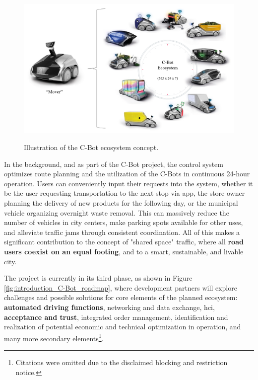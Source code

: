 \begin{figure}[htbp]
    \raggedright
        \caption{Illustration of the C-Bot ecosystem concept.}
        \includegraphics[width=1\textwidth]{resources/images/020-introduction/Introduction_context_C-Bot.png}
        \label{fig:introduction_C-Bot_ecosystem}
\end{figure} 

In the background, and as part of the C-Bot project, the control system optimizes route planning and the utilization of the C-Bots in continuous 24-hour operation. Users can conveniently input their requests into the system, whether it be the user requesting transportation to the next stop via app, the store owner planning the delivery of new products for the following day, or the municipal vehicle organizing overnight waste removal. This can massively reduce the number of vehicles in city centers, make parking spots available for other uses, and alleviate traffic jams through consistent coordination. All of this makes a significant contribution to the concept of "shared space" traffic, where all \textbf{road users coexist on an equal footing}, and to a smart, sustainable, and livable city.

The project is currently in its third phase, as shown in Figure \ref{fig:introduction_C-Bot_roadmap}, where development partners will explore challenges and possible solutions for core elements of the planned ecosystem: \textbf{automated driving functions}, networking and data exchange, \gls{hci}, \textbf{acceptance and trust}, integrated order management, identification and realization of potential economic and technical optimization in operation, and many more secondary elements\footnote{Citations were omitted due to the disclaimed blocking and restriction notice.}. 

